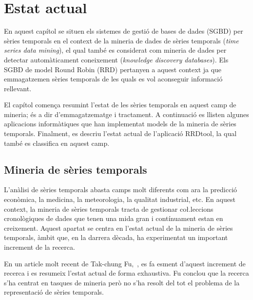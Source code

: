 \chapter{Estat actual}
\label{cap:estat}

En aquest capítol se situen els sistemes de gestió de bases de dades (SGBD) per sèries temporals en el context de la mineria de dades de sèries temporals (\emph{time series data mining}), el qual també es considerat com mineria de dades per  detectar automàticament coneixement (\emph{knowledge discovery databases}). Els SGBD de model Round Robin (RRD) pertanyen a aquest context ja que  emmagatzemen sèries temporals  de les quals es vol aconseguir informació rellevant.


El capítol comença resumint l'estat de les sèries temporals en aquest camp de mineria; és a dir d'emmagatzematge i tractament. A continuació es llisten algunes aplicacions informàtiques que han implementat models de la mineria de sèries temporals. Finalment, es descriu l'estat actual de l'aplicació RRDtool, la qual també es classifica en aquest camp.



\section{Mineria de sèries temporals}

L'anàlisi de sèries temporals abasta camps molt diferents com ara la predicció econòmica, la medicina, la meteorologia, la qualitat industrial, etc. En aquest context,  la mineria de sèries temporals tracta de gestionar co\l.leccions cronològiques de dades que tenen una mida gran i contínuament estan en creixement. 
Aquest apartat se centra en  l'estat actual de la mineria de sèries temporals, àmbit que, en la darrera dècada, ha experimentat un important increment de la recerca.


En un article molt recent de Tak-chung Fu,~\cite{fu11}, es fa esment d'aquest increment de recerca i es resumeix l'estat actual de forma exhaustiva. Fu conclou que la recerca s'ha centrat en tasques de mineria però no s'ha resolt del tot el problema de la representació de sèries temporals.

